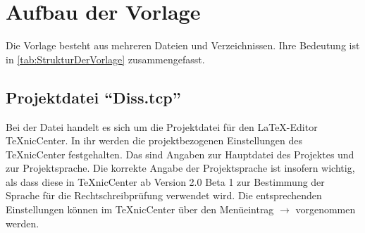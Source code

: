 \section{Aufbau der Vorlage}%
\label{sec:AufbauDerVorlage}
%
Die Vorlage besteht aus mehreren Dateien und Verzeichnissen.
Ihre Bedeutung ist in \cref{tab:StrukturDerVorlage} zusammengefasst.

\begingroup%
\small%
\renewcommand{\arraystretch}{2.0}%
\setlength{\tabcolsep}{0pt}%
\setlength{\topskip}{0pt}%
%
\endgroup%


\subsection[Projektdatei \enquote{Diss.tcp}]{Projektdatei \enquote{Diss.tcp}}%
%
\label{sec:Projektdatei}
%
Bei der Datei  handelt es sich um die Projektdatei für den \LaTeX-Editor TeXnicCenter.
In ihr werden die projektbezogenen Einstellungen des TeXnicCenter festgehalten.
Das sind \ua Angaben zur Hauptdatei des Projektes und zur Projektsprache.
Die korrekte Angabe der Projektsprache ist insofern wichtig, als dass diese in TeXnicCenter ab Version 2.0 Beta 1 zur Bestimmung der Sprache für die Rechtschreibprüfung verwendet wird.
Die entsprechenden Einstellungen können im TeXnicCenter über den Menüeintrag  $\rightarrow$  vorgenommen werden.


